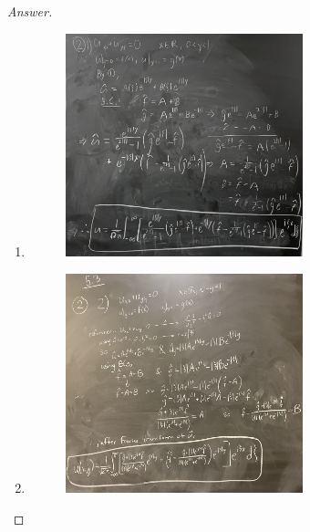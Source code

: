 \documentclass{article}
\theoremstyle{definition}
\renewcommand\qedsymbol{$\blacksquare$}
\newenvironment{ans}{\begin{proof}[Answer]\renewcommand{\qedsymbol}{}}{\end{proof}}
\begin{document}
\begin{ans}
    \begin{enumerate}
        \item \phantom{.}
        \begin{figure}[H]
            \centering
            \includegraphics[width = 0.65\textwidth]{Problem 2 Part 1.jpeg}
        \end{figure}

        \item \phantom{.}
        \begin{figure}[H]
            \centering
            \includegraphics[width = 0.65\textwidth]{Problem 2 Part 2.jpeg}
        \end{figure}


\end{enumerate}
\end{ans}
\end{document}
